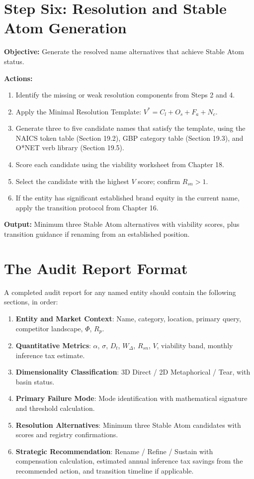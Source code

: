\documentclass[12pt, openany]{book}
\theoremstyle{thmstyle}
\theoremstyle{defstyle}
\newcommand{\vstar}{V^{*}}
\begin{document}
\section{Step Six: Resolution and Stable Atom Generation}

\begin{auditbox}
\textbf{Objective:} Generate the resolved name alternatives that achieve Stable Atom status.

\textbf{Actions:}
\begin{enumerate}[leftmargin=1.5em, topsep=2pt]
  \item Identify the missing or weak resolution components from Steps 2 and 4.
  \item Apply the Minimal Resolution Template: $\vstar = C_l + O_s + F_a + N_c$.
  \item Generate three to five candidate names that satisfy the template, using the NAICS token table (Section 19.2), GBP category table (Section 19.3), and O*NET verb library (Section 19.5).
  \item Score each candidate using the viability worksheet from Chapter 18.
  \item Select the candidate with the highest $V$ score; confirm $R_{sn} > 1$.
  \item If the entity has significant established brand equity in the current name, apply the transition protocol from Chapter 16.
\end{enumerate}

\textbf{Output:} Minimum three Stable Atom alternatives with viability scores, plus transition guidance if renaming from an established position.
\end{auditbox}

\section{The Audit Report Format}

A completed audit report for any named entity should contain the following sections, in order:

\begin{enumerate}[leftmargin=1.5em]
  \item \textbf{Entity and Market Context}: Name, category, location, primary query, competitor landscape, $\Phi$, $R_p$.
  \item \textbf{Quantitative Metrics}: $\alpha$, $\sigma$, $D_t$, $W_\Delta$, $R_{sn}$, $V$, viability band, monthly inference tax estimate.
  \item \textbf{Dimensionality Classification}: 3D Direct / 2D Metaphorical / Tear, with basin status.
  \item \textbf{Primary Failure Mode}: Mode identification with mathematical signature and threshold calculation.
  \item \textbf{Resolution Alternatives}: Minimum three Stable Atom candidates with scores and registry confirmations.
  \item \textbf{Strategic Recommendation}: Rename / Refine / Sustain with compensation calculation, estimated annual inference tax savings from the recommended action, and transition timeline if applicable.
\end{enumerate}
\end{document}
